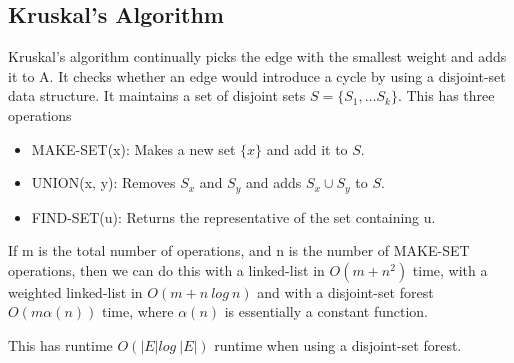 \documentclass{article}
\begin{document}
    \subsection{Kruskal's Algorithm}
        Kruskal's algorithm continually picks the edge with the smallest weight and adds it to A. It checks whether an edge would introduce a cycle by using a disjoint-set data structure. It maintains a set of disjoint sets $S = \{S_1, \dots S_k\}$. This has three operations
        \begin{itemize}
            \item MAKE-SET(x): Makes a new set $\{ x \}$ and add it to $S$.
            \item UNION(x, y): Removes $S_x$ and $S_y$ and adds $S_x \cup S_y$ to $S$.
            \item FIND-SET(u): Returns the representative of the set containing u.
        \end{itemize}
        If m is the total number of operations, and n is the number of MAKE-SET operations, then we can do this with a linked-list in $O(m + n^2)$ time, with a weighted linked-list in $O(m + n \: log \: n)$ and with a disjoint-set forest $O(m \alpha (n))$ time, where $\alpha (n)$ is essentially a constant function.
        \begin{algorithmic}
            \EndFor
                \EndIf
            \EndFor
        \end{algorithmic}
        This has runtime $O(|E|log \: |E|)$ runtime when using a disjoint-set forest.
\end{document}
